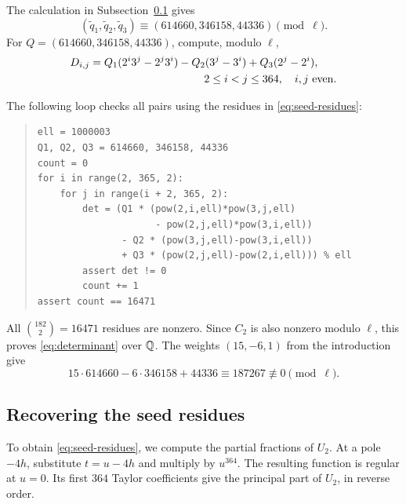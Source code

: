 The calculation in Subsection~\ref{subsec:seed-residues} gives
\begin{equation}\label{eq:seed-residues}
 (\widetilde q_1,\widetilde q_2,\widetilde q_3)
        \equiv(614660,346158,44336)\pmod\ell.
\end{equation}
For $Q=(614660,346158,44336)$, compute, modulo $\ell$,
\begin{align*}
 D_{i,j}={}&Q_1(2^i3^j-2^j3^i)
          -Q_2(3^j-3^i)+Q_3(2^j-2^i),\\
 &\hspace{32mm}2\leq i<j\leq364,\quad i,j\text{ even}.
\end{align*}
\begin{samepage}
The following loop checks all pairs using the residues
in \eqref{eq:seed-residues}:
\begin{quote}\small
\begin{verbatim}
ell = 1000003
Q1, Q2, Q3 = 614660, 346158, 44336
count = 0
for i in range(2, 365, 2):
    for j in range(i + 2, 365, 2):
        det = (Q1 * (pow(2,i,ell)*pow(3,j,ell)
                     - pow(2,j,ell)*pow(3,i,ell))
               - Q2 * (pow(3,j,ell)-pow(3,i,ell))
               + Q3 * (pow(2,j,ell)-pow(2,i,ell))) % ell
        assert det != 0
        count += 1
assert count == 16471
\end{verbatim}
\end{quote}
\end{samepage}
All $\binom{182}{2}=16471$ residues are nonzero. Since $C_2$ is also
nonzero modulo $\ell$, this proves \eqref{eq:determinant} over $\mathbb Q$.
The weights $(15,-6,1)$ from the introduction give
\begin{equation}\label{eq:one-pair}
 15\cdot614660-6\cdot346158+44336\equiv187267\not\equiv0\pmod\ell.
\end{equation}

\subsection{Recovering the seed residues}\label{subsec:seed-residues}

To obtain \eqref{eq:seed-residues}, we compute the partial fractions of
$U_2$. At a pole $-4h$, substitute $t=u-4h$ and multiply by $u^{364}$.
The resulting function is regular at $u=0$. Its first $364$ Taylor
coefficients give the principal part of $U_2$, in reverse order.

